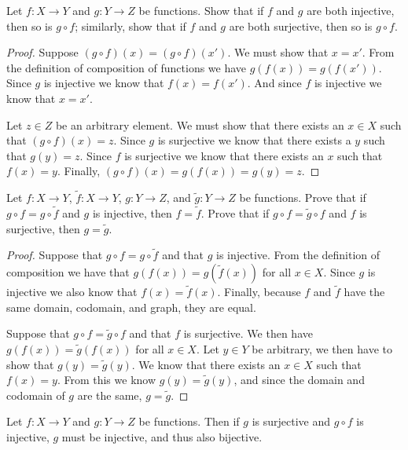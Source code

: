 \documentclass[12pt]{article}
\newenvironment{exercise}[2][Exercise]{\begin{trivlist}
\item[\hskip \labelsep {\bfseries #1}\hskip \labelsep {\bfseries #2}]}{\end{trivlist}}
\newenvironment{conjecture}[2][Conjecture]{\begin{trivlist}
\item[\hskip \labelsep {\bfseries #1}\hskip \labelsep {\bfseries #2}]}{\end{trivlist}}
\begin{document}
\begin{exercise}{3.3.2}
	Let $ f: X \to Y $ and $ g: Y \to Z $ be functions.
	Show that if $ f $ and $ g $ are both injective, then so is $ g \circ f $; similarly, show that if $ f $ and $ g $ are both surjective, then so is $ g \circ f $.
\end{exercise}
\begin{proof}
	Suppose $ (g \circ f)(x) = (g \circ f)(x') $.
	We must show that $ x = x' $.
	From the definition of composition of functions we have $ g(f(x)) = g(f(x')) $.
	Since $ g $ is injective we know that $ f(x) = f(x') $.
	And since $ f $ is injective we know that $ x = x' $.
	
	Let $ z \in Z $ be an arbitrary element.
	We must show that there exists an $ x \in X $ such that $ (g \circ f)(x) = z $.
	Since $ g $ is surjective we know that there exists a $ y $ such that $ g(y) = z $.
	Since $ f $ is surjective we know that there exists an $ x $ such that $ f(x) = y $.
	Finally, $ (g \circ f)(x) = g(f(x)) = g(y) = z $.
\end{proof}

\begin{exercise}{3.3.4}
	Let $ f: X \to Y$, $ \tilde{f}: X \to Y$, $g: Y \to Z$, and $ \tilde{g}: Y \to Z $ be functions.
	Prove that if $ g \circ f = g \circ \tilde{f} $ and $ g $ is injective, then $ f = \tilde{f} $.
	Prove that if $ g \circ f = \tilde{g} \circ f $ and $ f $ is surjective, then $ g = \tilde{g} $.
\end{exercise}
\begin{proof}
	Suppose that $ g \circ f = g \circ \tilde{f} $ and that $ g $ is injective.
	From the definition of composition we have that $ g(f(x)) = g(\tilde{f}(x)) $ for all $ x \in X $.
	Since $ g $ is injective we also know that $ f(x) = \tilde{f}(x) $.
	Finally, because $ f $ and $ \tilde{f} $ have the same domain, codomain, and graph, they are equal.
	
	Suppose that $ g \circ f = \tilde{g} \circ f $ and that $ f $ is surjective.
	We then have $ g(f(x)) = \tilde{g}(f(x)) $ for all $ x \in X $.
	Let $ y \in Y $ be arbitrary, we then have to show that $ g(y) = \tilde{g}(y) $.
	We know that there exists an $ x \in X $ such that $ f(x) = y $.
	From this we know $ g(y) = \tilde{g}(y) $, and since the domain and codomain of $ g $ are the same, $ g = \tilde{g} $.
\end{proof}

\begin{conjecture}{}
	Let $ f: X \to Y $ and $ g: Y \to Z $ be functions.
	Then if $ g $ is surjective and $ g \circ f $ is injective, $ g $ must be injective, and thus also bijective.
\end{conjecture}
\end{document}
